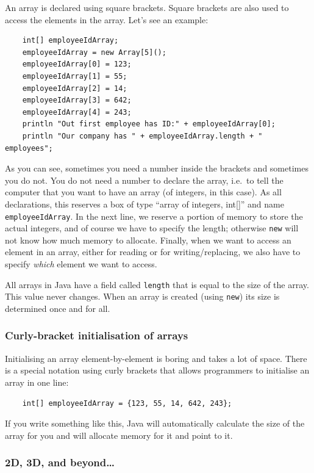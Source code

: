 An array is declared using square brackets. Square brackets are also
used to access the elements in the array. Let's see an example: 

\begin{verbatim}
    int[] employeeIdArray;
    employeeIdArray = new Array[5]();
    employeeIdArray[0] = 123;
    employeeIdArray[1] = 55;
    employeeIdArray[2] = 14;
    employeeIdArray[3] = 642;
    employeeIdArray[4] = 243;
    println "Out first employee has ID:" + employeeIdArray[0];
    println "Our company has " + employeeIdArray.length + " employees";
\end{verbatim}

As you can see, sometimes you need a number inside the brackets and
sometimes you do not. You do not need a number to declare the array,
i.e.~to tell the computer that you want to have an array (of integers,
in this case). As all declarations, this reserves a box of type
``array of integers, int[]'' and name \verb+employeeIdArray+. In the
next line, we reserve a portion of memory to store the actual
integers, and of course we have to specify the length; otherwise
\verb+new+ will not know how much memory to allocate. Finally, when we
want to access an element in an array, either for reading or for
writing/replacing, we also have to specify \emph{which} element we
want to access. 

All arrays in Java have a field called \verb+length+ that is equal to
the size of the array. This value never changes. When an array is
created (using \verb+new+) its size is determined once and for all. 

\subsubsection*{Curly-bracket initialisation of arrays}
\label{sec:curly-brack-init}

Initialising an array element-by-element is boring and takes a lot of
space. There is a special notation using curly brackets that allows
programmers to initialise an array in one line: 

\begin{verbatim}
    int[] employeeIdArray = {123, 55, 14, 642, 243};
\end{verbatim}

If you write something like this, Java will automatically calculate
the size of the array for you and will allocate memory for it and
point to it. 

\subsubsection*{2D, 3D, and beyond\ldots}
\label{sec:2d-3d-beyondldots}

